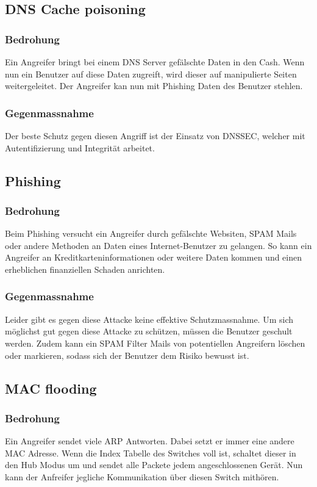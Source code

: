 \documentclass[11pt,a4paper,parskip=half]{scrartcl}
\begin{document}
\subsection{DNS Cache poisoning}
\subsubsection{Bedrohung}
Ein Angreifer bringt bei einem DNS Server gefälschte Daten in den Cash. Wenn nun ein Benutzer auf diese Daten zugreift, wird dieser auf manipulierte Seiten weitergeleitet. Der Angreifer kan nun mit Phishing Daten des Benutzer stehlen.

\subsubsection{Gegenmassnahme}
Der beste Schutz gegen diesen Angriff ist der Einsatz von DNSSEC, welcher mit Autentifizierung und Integrität arbeitet.
\subsection{Phishing}
\subsubsection{Bedrohung}
Beim Phishing versucht ein Angreifer durch gefälschte Websiten, SPAM Mails oder andere Methoden an Daten eines Internet-Benutzer zu gelangen. So kann ein Angreifer an Kreditkarteninformationen oder weitere Daten kommen und einen erheblichen finanziellen Schaden anrichten.
\subsubsection{Gegenmassnahme}
Leider gibt es gegen diese Attacke keine effektive Schutzmassnahme. Um sich möglichst gut gegen diese Attacke zu schützen, müssen die Benutzer geschult werden. Zudem kann ein SPAM Filter Mails von potentiellen Angreifern löschen oder markieren, sodass sich der Benutzer dem Risiko bewusst ist.

\subsection{MAC flooding}
\subsubsection{Bedrohung}
Ein Angreifer sendet viele ARP Antworten. Dabei setzt er immer eine andere MAC Adresse. Wenn die Index Tabelle des Switches voll ist, schaltet dieser in den Hub Modus um und sendet alle Packete jedem angeschlossenen Gerät. Nun kann der Anfreifer jegliche Kommunikation über diesen Switch mithören. 
\end{document}
